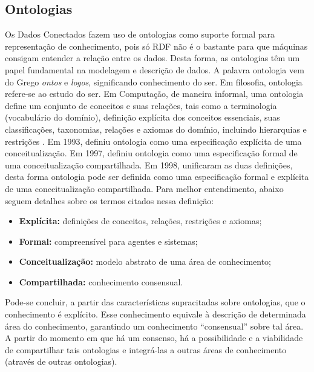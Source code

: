 \subsection{Ontologias}
Os Dados Conectados fazem uso de ontologias como suporte formal para representação de conhecimento, pois só RDF não é o bastante para que máquinas consigam entender a relação entre os dados. Desta forma, as ontologias têm um papel fundamental na modelagem e descrição de dados. A palavra ontologia vem do Grego \textit{ontos} e \textit{logos}, significando conhecimento do ser. Em filosofia, ontologia refere-se ao estudo do ser. Em Computação, de maneira informal, uma ontologia define um conjunto de conceitos e suas relações, tais como a terminologia (vocabulário do domínio), definição explícita dos conceitos essenciais, suas classificações, taxonomias, relações e axiomas do domínio, incluindo hierarquias e restrições \cite{deved2006semantic}. Em 1993, \citeauthor{gruber1993translation} definiu ontologia como uma especificação explícita de uma conceitualização. Em 1997, \citeauthor{borstw1997construction} definiu ontologia como uma especificação formal de uma conceitualização compartilhada. Em 1998, \citeauthor{studer1998knowledge} unificaram as duas definições, desta forma ontologia pode ser definida como uma especificação formal e explícita de uma conceitualização compartilhada. Para melhor entendimento, abaixo seguem detalhes sobre os termos citados nessa definição: 
% 
% 
%
%
\begin{itemize}
	\item \textbf{Explícita:} definições de conceitos, relações, restrições e axiomas; 
	\item \textbf{Formal:} compreensível para agentes e sistemas; 
	\item \textbf{Conceitualização:} modelo abstrato de uma área de conhecimento; 
	\item \textbf{Compartilhada:} conhecimento consensual. 
\end{itemize}
Pode-se concluir, a partir das características supracitadas sobre ontologias, que o conhecimento é explícito. Esse conhecimento equivale à descrição de determinada área do conhecimento, garantindo um conhecimento “consensual” sobre tal área. A partir do momento em que há um consenso, há a possibilidade e a viabilidade de compartilhar tais ontologias e integrá-las a outras áreas de conhecimento (através de outras ontologias).

